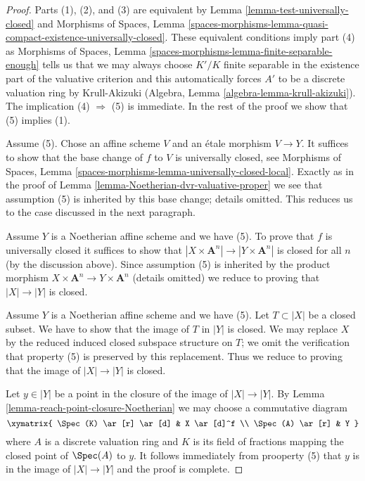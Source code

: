 \begin{proof}
Parts (1), (2), and (3) are equivalent by
Lemma \ref{lemma-test-universally-closed} and
Morphisms of Spaces, Lemma
\ref{spaces-morphisms-lemma-quasi-compact-existence-universally-closed}.
These equivalent conditions imply part (4) as
Morphisms of Spaces, Lemma \ref{spaces-morphisms-lemma-finite-separable-enough}
tells us that we may always choose $K'/K$ finite separable in
the existence part of the valuative criterion and this
automatically forces $A'$ to be a discrete valuation ring by Krull-Akizuki
(Algebra, Lemma \ref{algebra-lemma-krull-akizuki}).
The implication (4) $\Rightarrow$ (5) is immediate.
In the rest of the proof we show that (5) implies (1).

\medskip\noindent
Assume (5). Chose an affine scheme $V$ and an \'etale morphism $V \to Y$.
It suffices to show that the base change of $f$ to $V$ is universally closed,
see Morphisms of Spaces, Lemma
\ref{spaces-morphisms-lemma-universally-closed-local}.
Exactly as in the proof of Lemma \ref{lemma-Noetherian-dvr-valuative-proper}
we see that assumption (5) is inherited by this base change; details
omitted. This reduces us to the case discussed in the next paragraph.

\medskip\noindent
Assume $Y$ is a Noetherian affine scheme and we have (5).
To prove that $f$ is universally closed it suffices to show that
$|X \times \mathbf{A}^n| \to |Y \times \mathbf{A}^n|$ is closed
for all $n$ (by the discussion above). Since assumption (5)
is inherited by the product morphism
$X \times \mathbf{A}^n \to Y \times \mathbf{A}^n$ (details omitted)
we reduce to proving that $|X| \to |Y|$ is closed.

\medskip\noindent
Assume $Y$ is a Noetherian affine scheme and we have (5).
Let $T \subset |X|$ be a closed subset. We have to show that
the image of $T$ in $|Y|$ is closed. We may replace $X$
by the reduced induced closed subspace structure on $T$; we
omit the verification that property (5) is preserved by
this replacement. Thus we reduce to proving that the image
of $|X| \to |Y|$ is closed.

\medskip\noindent
Let $y \in |Y|$ be a point in the closure of the image of
$|X| \to |Y|$. By Lemma \ref{lemma-reach-point-closure-Noetherian}
we may choose a commutative diagram
$$
\xymatrix{
\Spec(K) \ar[r] \ar[d] & X \ar[d]^f \\
\Spec(A) \ar[r] & Y
}
$$
where $A$ is a discrete valuation ring and $K$ is its field of fractions
mapping the closed point of $\Spec(A)$ to $y$. It follows immediately
from prooperty (5) that $y$ is in the image of
$|X| \to |Y|$ and the proof is complete.
\end{proof}


















